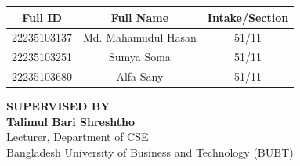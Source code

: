 \documentclass[12pt,a4paper]{report}
\begin{document}
\begin{titlepage}
\begin{center}
    \begin{tabular}{|c|c|c|}
        \hline
        \textbf{Full ID} & \textbf{Full Name} & \textbf{Intake/Section} \\
        \hline
        22235103137 & Md. Mahamudul Hasan & 51/11 \\
        \hline
        22235103251 & Sumya Soma & 51/11 \\
        \hline
        22235103680 & Alfa Sany & 51/11 \\
        \hline
    \end{tabular}
\end{center}

\vspace{2cm}

\begin{center}
    \textbf{SUPERVISED BY}\\[2ex]

    \textbf{Talimul Bari Shreshtho}\\
    Lecturer, Department of CSE\\
    Bangladesh University of Business and Technology (BUBT)
\end{center}

\end{titlepage}


\end{document}
